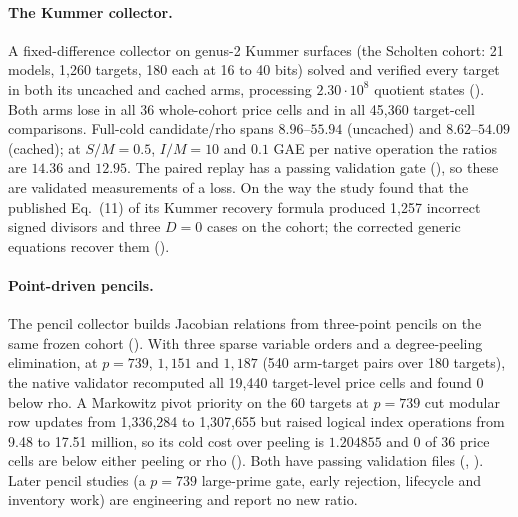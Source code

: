 \paragraph{The Kummer collector.} A fixed-difference collector on genus-2
Kummer surfaces (the Scholten cohort: 21 models, 1{,}260 targets, 180 each at
16 to 40 bits) solved and verified every target in both its uncached and
cached arms, processing $2.30\cdot10^8$ quotient states
(). Both arms
lose in all 36 whole-cohort price cells and in all 45{,}360 target-cell
comparisons. Full-cold candidate/rho spans $8.96$--$55.94$ (uncached) and
$8.62$--$54.09$ (cached); at $S/M=0.5$, $I/M=10$ and $0.1$ GAE per native
operation the ratios are $14.36$ and $12.95$. The paired replay has a
passing validation gate (),
so these are validated measurements of a loss. On the way the study found
that the published Eq.~(11) of its Kummer recovery formula produced 1{,}257
incorrect signed divisors and three $D=0$ cases on the cohort; the corrected
generic equations recover them
().

\paragraph{Point-driven pencils.} The pencil collector builds Jacobian
relations from three-point pencils on the same frozen cohort
(). With three sparse
variable orders and a degree-peeling elimination, at $p=739$, $1{,}151$ and
$1{,}187$ (540 arm-target pairs over 180 targets), the native validator
recomputed all 19{,}440 target-level price cells and found 0 below rho. A
Markowitz pivot priority on the 60 targets at $p=739$ cut modular row updates
from 1{,}336{,}284 to 1{,}307{,}655 but raised logical index operations from
9.48 to 17.51 million, so its cold cost over peeling is $1.204855$ and 0 of 36
price cells are below either peeling or rho
(). Both have passing
validation files (,
). Later pencil
studies (a $p=739$ large-prime gate, early rejection, lifecycle and
inventory work) are engineering and report no new ratio.

